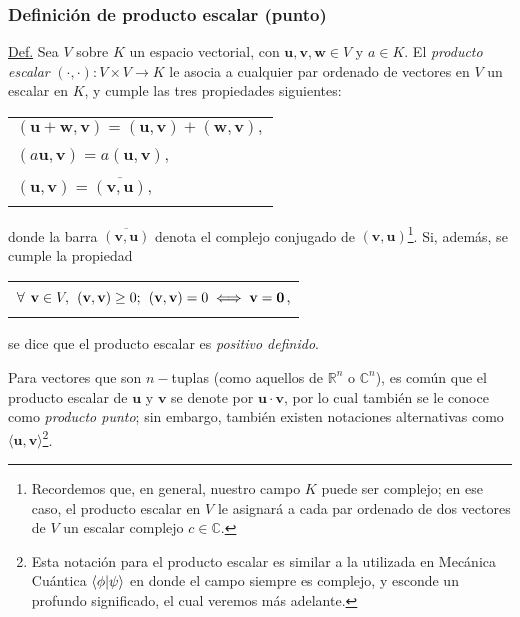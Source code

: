 \documentclass[12pt]{article}
\begin{document}
\subsubsection{Definición de producto escalar (punto)} \label{Def:Producto_escalar}

\begin{tcolorbox}
\underline{Def.} Sea $V$ sobre $K$ un espacio vectorial, con $\mathbf{u},\mathbf{v},\mathbf{w}\in V$ y $a\in K$. El \textit{producto escalar} $(\cdot\mathop ,\cdot):V\times V\rightarrow K$ le asocia a cualquier par ordenado de vectores en $V$ un escalar en $K$, y cumple las tres propiedades siguientes:

\begin{tabular}{l}
    \\
    $(\mathbf{u}+\mathbf{w},\mathbf{v}) = (\mathbf{u},\mathbf{v})+(\mathbf{w},\mathbf{v}),$ \\ \\ $(a\mathbf{u},\mathbf{v}) = a(\mathbf{u},\mathbf{v}),$ \\ \\
    $(\mathbf{u},\mathbf{v})=\overline{(\mathbf{v},\mathbf{u})},$ \\ \\
\end{tabular}

donde la barra $\overline{(\mathbf{v},\mathbf{u})}$ denota el complejo conjugado de $(\mathbf{v},\mathbf{u})$\footnote{Recordemos que, en general, nuestro campo $K$ puede ser complejo; en ese caso, el producto escalar en $V$ le asignará a cada par ordenado de dos vectores de $V$ un escalar complejo $c\in\mathbb{C}$.}. Si, además, se cumple la propiedad

\begin{tabular}{l}
    \\
    $\forall\hspace{1.5mm}\mathbf{v}\in V, \hspace{1.5mm} (\mathbf{v},\mathbf{v})\geq0; \hspace{1.5mm} (\mathbf{v},\mathbf{v}) = 0 \iff \mathbf{v}=\mathbf{0}$, \\ \\
\end{tabular}

se dice que el producto escalar es \textit{positivo definido}.

\vspace{3mm}
\hspace{2.5mm} Para vectores que son $n-$tuplas (como aquellos de $\mathbb{R}^n$ o $\mathbb{C}^n$), es común que el producto escalar de $\mathbf{u}$ y $\mathbf{v}$ se denote por $\mathbf{u}\cdot\mathbf{v}$, por lo cual también se le conoce como \textit{producto punto}; sin embargo, también existen notaciones alternativas como $\langle \mathbf{u}, \mathbf{v}\rangle$\footnote{Esta notación para el producto escalar es similar a la utilizada en Mecánica Cuántica $\braket{\phi|\psi}$ \textemdash en donde el campo siempre es complejo\textemdash, y esconde un profundo significado, el cual veremos más adelante.}.

\end{tcolorbox}{}
\end{document}
